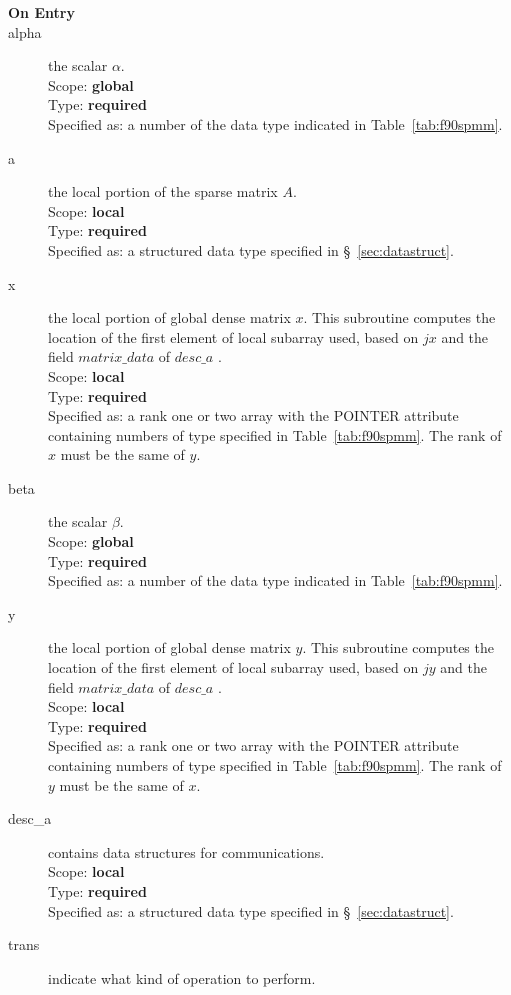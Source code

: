 \begin{description}
\item[\bf On Entry]
\item[alpha] the scalar $\alpha$.\\
Scope: {\bf global} \\
Type: {\bf required}\\
Specified as: a number of the data type indicated in
Table~\ref{tab:f90spmm}. 
\item[a] the local portion of the sparse matrix
$A$. \\ 
Scope: {\bf local} \\
Type: {\bf required}\\
Specified as: a structured data type specified in
\S~\ref{sec:datastruct}.
\item[x] the local portion of global dense matrix
$x$. This subroutine computes the location of the first element of
local subarray used, based on $jx$ and the field $matrix\_data$ of $desc\_a$ . \\
Scope: {\bf local} \\
Type: {\bf required} \\
Specified as:  a rank one or two array with the POINTER attribute
containing numbers of type specified in
Table~\ref{tab:f90spmm}.  The rank of $x$ must be the same of $y$. 
\item[beta] the scalar $\beta$.\\
Scope: {\bf global} \\
Type: {\bf required} \\
Specified as: a number of the data type indicated in Table~\ref{tab:f90spmm}.
\item[y] the local portion of global dense matrix
$y$. This subroutine computes the location of the first element of
local subarray used, based on $jy$ and the field $matrix\_data$ of $desc\_a$ . \\
Scope: {\bf local} \\
Type: {\bf required} \\
Specified as:  a rank one or two array with the POINTER attribute
containing numbers of type specified in
Table~\ref{tab:f90spmm}. The rank of $y$ must be the same of $x$. 
\item[desc\_a] contains data structures for communications.\\
Scope: {\bf local} \\
Type: {\bf required}\\
Specified as: a structured data type specified in
\S~\ref{sec:datastruct}.
\item[trans] indicate what kind of operation to perform.

\end{description}
